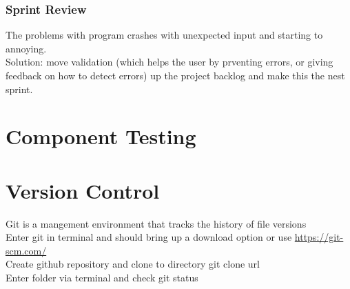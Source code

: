 \documentclass[a4paper,12pt]{article}
\begin{document}
\subsubsection{Sprint Review}
The problems with program crashes with unexpected input and starting to annoying. \\
Solution: move validation (which helps the user by prventing errors, or giving feedback on how to detect errors) up the project backlog and make this the nest sprint.
\section{Component Testing}
\section{Version Control}
Git is a mangement environment that tracks the history of file versions \\

Enter   git   in terminal and should bring up a download option or use \url{https://git-scm.com/}\\

Create github repository and clone to directory     git clone url\\

Enter folder via terminal and check    git status








	
	
	
	
	
	
	
	
	
	
	
\end{document}
